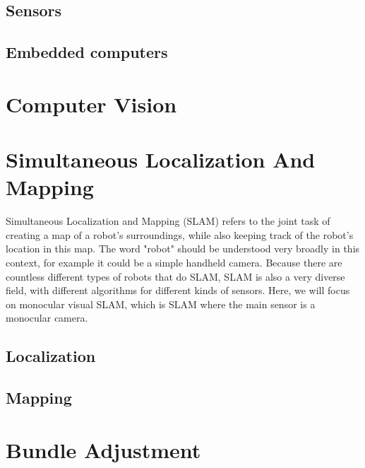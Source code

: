 \subsection{Sensors}

\subsection{Embedded computers}

\section{Computer Vision}

\section{Simultaneous Localization And Mapping}
Simultaneous Localization and Mapping (SLAM) refers to the joint task of creating a map of a robot's surroundings, while also keeping track of the robot's location in this map. The word "robot" should be understood very broadly in this context, for example it could be a simple handheld camera. Because there are countless different types of robots that do SLAM, SLAM is also a very diverse field, with different algorithms for different kinds of sensors. Here, we will focus on monocular visual SLAM, which is SLAM where the main sensor is a monocular camera.

\subsection{Localization}

\subsection{Mapping}

\section{Bundle Adjustment}
